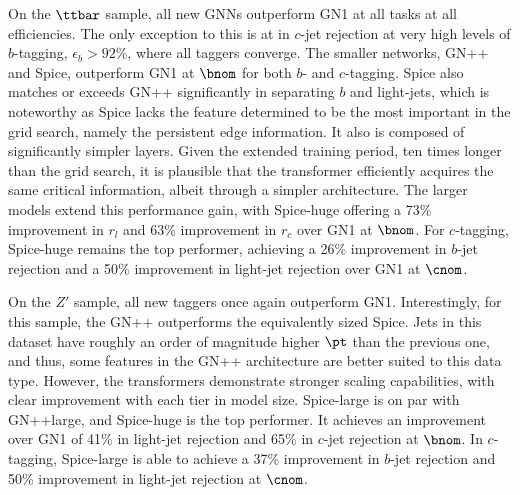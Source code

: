 On the $\ttbar$ sample, all new GNNs outperform GN1 at all tasks at all efficiencies.
The only exception to this is at in $c$-jet rejection at very high levels of $b$-tagging, $\epsilon_b > 92\%$, where all taggers converge.
The smaller networks, GN++ and Spice, outperform GN1 at $\bnom$ for both $b$- and $c$-tagging.
Spice also matches or exceeds GN++ significantly in separating $b$ and light-jets, which is noteworthy as Spice lacks the feature determined to be the most important in the grid search, namely the persistent edge information.
It also is composed of significantly simpler layers.
Given the extended training period, ten times longer than the grid search, it is plausible that the transformer efficiently acquires the same critical information, albeit through a simpler architecture.
The larger models extend this performance gain, with Spice-huge offering a 73\% improvement in $r_l$ and 63\% improvement in $r_c$ over GN1 at $\bnom$.
For $c$-tagging, Spice-huge remains the top performer, achieving a 26\% improvement in $b$-jet rejection and a 50\% improvement in light-jet rejection over GN1 at $\cnom$.

On the $Z'$ sample, all new taggers once again outperform GN1.
Interestingly, for this sample, the GN++ outperforms the equivalently sized Spice.
Jets in this dataset have roughly an order of magnitude higher $\pt$ than the previous one, and thus, some features in the GN++ architecture are better suited to this data type.
However, the transformers demonstrate stronger scaling capabilities, with clear improvement with each tier in model size.
Spice-large is on par with GN++large, and Spice-huge is the top performer.
It achieves an improvement over GN1 of 41\% in light-jet rejection and 65\% in $c$-jet rejection at $\bnom$.
In $c$-tagging, Spice-large is able to achieve a 37\% improvement in $b$-jet rejection and 50\% improvement in light-jet rejection at $\cnom$.

